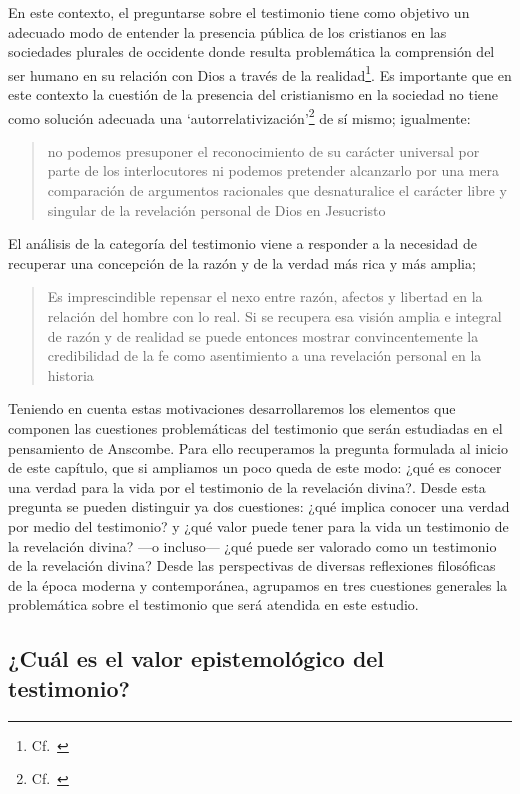 En este contexto, el preguntarse sobre el testimonio tiene como objetivo un adecuado modo de entender la presencia pública de los cristianos en las sociedades plurales de occidente donde resulta problemática la comprensión del ser humano en su relación con Dios a través de la realidad\footnote{Cf.~\cite[75]{prades2015testimonio}}. Es importante que en este contexto la cuestión de la presencia del cristianismo en la sociedad no tiene como solución adecuada una `autorrelativización'\footnote{Cf.~\cite[75;\,40-44]{prades2015testimonio}} de sí mismo; igualmente: \blockquote[{\cite[75; Cf.~33-40]{prades2015testimonio}}]{no podemos presuponer el reconocimiento de su carácter universal por parte de los interlocutores ni podemos pretender alcanzarlo por una mera comparación de argumentos racionales que desnaturalice el carácter libre y singular de la revelación personal de Dios en Jesucristo}. El análisis de la categoría del testimonio viene a responder a la necesidad de recuperar una concepción de la razón y de la verdad más rica y más amplia; \blockquote[{\cite[76]{prades2015testimonio}}]{Es imprescindible repensar el nexo entre razón, afectos y libertad en la relación del hombre con lo real. Si se recupera esa visión amplia e integral de razón y de realidad se puede entonces mostrar convincentemente la credibilidad de la fe como asentimiento a una revelación personal en la historia}.

Teniendo en cuenta estas motivaciones desarrollaremos los elementos que componen las cuestiones problemáticas del testimonio que serán estudiadas en el pensamiento de Anscombe. Para ello recuperamos la pregunta formulada al inicio de este capítulo, que si ampliamos un poco queda de este modo: ¿qué es conocer una verdad para la vida por el testimonio de la revelación divina?. Desde esta pregunta se pueden distinguir ya dos cuestiones: ¿qué implica conocer una verdad por medio del testimonio? y ¿qué valor puede tener para la vida un testimonio de la revelación divina? ---o incluso--- ¿qué puede ser valorado como un testimonio de la revelación divina? Desde las perspectivas de diversas reflexiones filosóficas de la época moderna y contemporánea, agrupamos en tres cuestiones generales la problemática sobre el testimonio que será atendida en este estudio.

\subsection{¿Cuál es el valor epistemológico del testimonio?}

